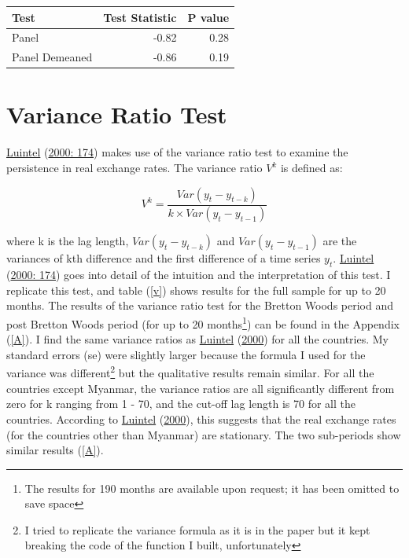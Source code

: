 \documentclass[11pt,preprint, authoryear]{elsarticle}
\let\origtable\table
\let\endorigtable\endtable
\renewenvironment{table}[1][2] {
    \expandafter\origtable\expandafter[H]
} {
    \endorigtable
}
\numberwithin{equation}{section}
\numberwithin{figure}{section}
\numberwithin{table}{section}
\let\rmarkdownfootnote\footnote%
\def\footnote{\protect\rmarkdownfootnote}
\begin{document}
\begin{table}[H]
\centering
\caption{Bootstrapped panel unit root tests} 
\label{Boot}
\begin{tabular}{lrr}
  \hline
Test & Test Statistic & P value \\ 
  \hline
Panel & -0.82 & 0.28 \\ 
  Panel Demeaned & -0.86 & 0.19 \\ 
   \hline
\end{tabular}
\end{table}

\hypertarget{variance-ratio-test}{%
\section{\texorpdfstring{Variance Ratio Test
\label{Var}}{Variance Ratio Test }}\label{variance-ratio-test}}

\protect\hyperlink{ref-Kul}{Luintel} (\protect\hyperlink{ref-Kul}{2000:
174}) makes use of the variance ratio test to examine the persistence in
real exchange rates. The variance ratio \(V^k\) is defined as:

\[
V^k = \frac{Var(y_t - y_{t-k})}{k \times Var(y_t - y_{t-1}) } 
\]

where k is the lag length, \(Var(y_t - y_{t-k})\) and
\(Var(y_t - y_{t-1})\) are the variances of kth difference and the first
difference of a time series \(y_t\).
\protect\hyperlink{ref-Kul}{Luintel} (\protect\hyperlink{ref-Kul}{2000:
174}) goes into detail of the intuition and the interpretation of this
test. I replicate this test, and table (\ref{v}) shows results for the
full sample for up to 20 months. The results of the variance ratio test
for the Bretton Woods period and post Bretton Woods period (for up to 20
months\footnote{The results for 190 months are available upon request;
  it has been omitted to save space}) can be found in the Appendix
(\ref{A}). I find the same variance ratios as
\protect\hyperlink{ref-Kul}{Luintel} (\protect\hyperlink{ref-Kul}{2000})
for all the countries. My standard errors (se) were slightly larger
because the formula I used for the variance was different\footnote{I
  tried to replicate the variance formula as it is in the paper but it
  kept breaking the code of the function I built, unfortunately} but the
qualitative results remain similar. For all the countries except
Myanmar, the variance ratios are all significantly different from zero
for k ranging from 1 - 70, and the cut-off lag length is 70 for all the
countries. According to \protect\hyperlink{ref-Kul}{Luintel}
(\protect\hyperlink{ref-Kul}{2000}), this suggests that the real
exchange rates (for the countries other than Myanmar) are stationary.
The two sub-periods show similar results (\ref{A}).
\end{document}
